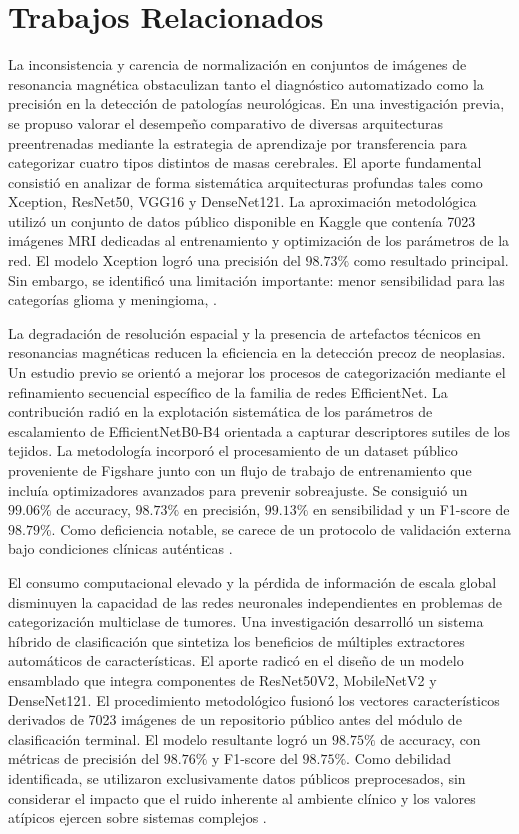 \section{Trabajos Relacionados}
\label{sec:related_work}

La inconsistencia y carencia de normalización en conjuntos de imágenes de resonancia magnética obstaculizan tanto el diagnóstico automatizado como la precisión en la detección de patologías neurológicas. En una investigación previa, se propuso valorar el desempeño comparativo de diversas arquitecturas preentrenadas mediante la estrategia de aprendizaje por transferencia para categorizar cuatro tipos distintos de masas cerebrales. El aporte fundamental consistió en analizar de forma sistemática arquitecturas profundas tales como Xception, ResNet50, VGG16 y DenseNet121. La aproximación metodológica utilizó un conjunto de datos público disponible en Kaggle que contenía 7023 imágenes MRI dedicadas al entrenamiento y optimización de los parámetros de la red. El modelo Xception logró una precisión del $98.73\%$ como resultado principal. Sin embargo, se identificó una limitación importante: menor sensibilidad para las categorías glioma y meningioma, \cite{Disci2025}.

La degradación de resolución espacial y la presencia de artefactos técnicos en resonancias magnéticas reducen la eficiencia en la detección precoz de neoplasias. Un estudio previo se orientó a mejorar los procesos de categorización mediante el refinamiento secuencial específico de la familia de redes EfficientNet. La contribución radió en la explotación sistemática de los parámetros de escalamiento de EfficientNetB0-B4 orientada a capturar descriptores sutiles de los tejidos. La metodología incorporó el procesamiento de un dataset público proveniente de Figshare junto con un flujo de trabajo de entrenamiento que incluía optimizadores avanzados para prevenir sobreajuste. Se consiguió un $99.06\%$ de accuracy, $98.73\%$ en precisión, $99.13\%$ en sensibilidad y un F1-score de $98.79\%$. Como deficiencia notable, se carece de un protocolo de validación externa bajo condiciones clínicas auténticas \cite{BabuVimala2023}.

El consumo computacional elevado y la pérdida de información de escala global disminuyen la capacidad de las redes neuronales independientes en problemas de categorización multiclase de tumores. Una investigación desarrolló un sistema híbrido de clasificación que sintetiza los beneficios de múltiples extractores automáticos de características. El aporte radicó en el diseño de un modelo ensamblado que integra componentes de ResNet50V2, MobileNetV2 y DenseNet121. El procedimiento metodológico fusionó los vectores característicos derivados de 7023 imágenes de un repositorio público antes del módulo de clasificación terminal. El modelo resultante logró un $98.75\%$ de accuracy, con métricas de precisión del $98.76\%$ y F1-score del $98.75\%$. Como debilidad identificada, se utilizaron exclusivamente datos públicos preprocesados, sin considerar el impacto que el ruido inherente al ambiente clínico y los valores atípicos ejercen sobre sistemas complejos \cite{DwiPrayogo2025}.

